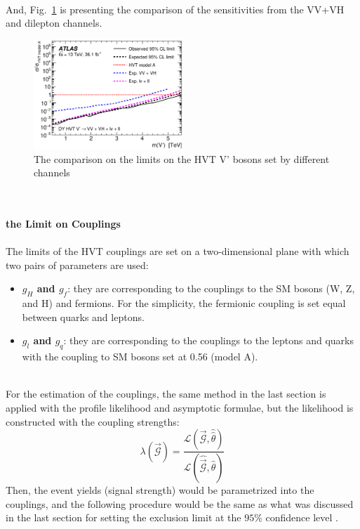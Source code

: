 \\And, Fig.~\ref{Fig:limit_GGFHVTV_compare} is presenting the comparison of the sensitivities from the VV+VH and dilepton channels. 
\begin{figure}[ht]
	\centering
    \includegraphics[width=0.5\textwidth]{Chapter4/GGFALLHVTV_compare.eps}
    \caption{The comparison on the limits on the HVT V' bosons set by different channels}
	\label{Fig:limit_GGFHVTV_compare}
\end{figure}
\noindent
\\
\\{\bf the Limit on Couplings}
\\
\\The limits of the HVT couplings are set on a two-dimensional plane with which two pairs of parameters are used:
\begin{itemize}
  \item[] {\bf $g_{H}$ and $g_{f}$}: they are corresponding to the couplings to the SM bosons (W, Z, and H) and fermions. For the simplicity, the fermionic coupling is set equal between quarks and leptons. 
  \item[] {\bf $g_{l}$ and $g_{q}$}: they are corresponding to the couplings to the leptons and quarks with the coupling to SM bosons set at 0.56 (model A).
\end{itemize}
\noindent
\\For the estimation of the couplings, the same method in the last section is applied with the profile likelihood and asymptotic formulae, but the likelihood is constructed with the coupling strengths:
\begin{equation}
\lambda(\vec{\mathcal{G}}) = \frac{\mathcal{L}(\vec{\mathcal{G}},\hat{\hat{\theta}})}{\mathcal{L}(\hat{\vec{\mathcal{G}}},\hat{\theta})}
\end{equation}
Then, the event yields (signal strength) would be parametrized into the couplings, and the following procedure would be the same as what was discussed in the last section for setting the exclusion limit at the $95\%$ confidence level .
